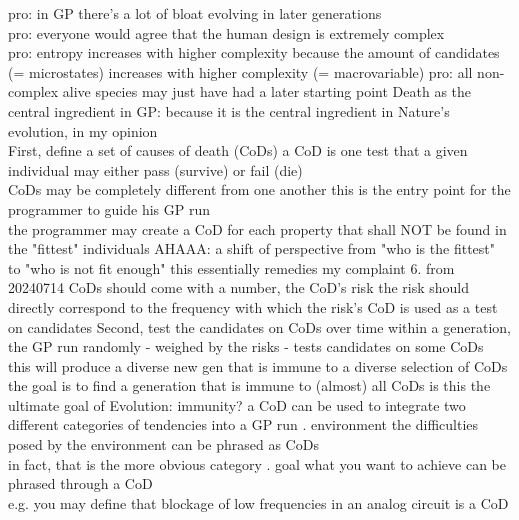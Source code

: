 \documentclass{article}\usepackage[margin=2cm]{geometry}
\begin{document}
\begin{cascade}
    pro: in GP there's a lot of bloat evolving in later generations\\
    pro: everyone would agree that the human design is extremely complex\\
    pro: entropy increases with higher complexity
    \stepin
    because the amount of candidates (= microstates) increases with higher complexity (= macrovariable)
    \stepout
    pro: all non-complex alive species may just have had a later starting point
    \stepout
    Death as the central ingredient in GP:
    \stepin
    because it is the central ingredient in Nature's evolution, in my opinion\\
    First, define a set of causes of death (CoDs)
    \stepin
    a CoD is one test that a given individual may either pass (survive) or fail (die)\\
    CoDs may be completely different from one another
    \stepin
    this is the entry point for the programmer to guide his GP run\\
    the programmer may create a CoD for each property that shall NOT be found in the "fittest" individuals
    \stepin
    AHAAA: a shift of perspective from "who is the fittest" to "who is not fit enough"
    \stepin
    this essentially remedies my complaint 6. from 20240714
    \stepout
    \stepout
    \stepout
    CoDs should come with a number, the CoD's risk
    \stepin
    the risk should directly correspond to the frequency with which the risk's CoD is used as a test on candidates
    \stepout
    \stepout
    Second, test the candidates on CoDs over time
    \stepin
    within a generation, the GP run randomly - weighed by the risks - tests candidates on some CoDs\\
    this will produce a diverse new gen that is immune to a diverse selection of CoDs\\
    the goal is to find a generation that is immune to (almost) all CoDs
    \stepin
    is this the ultimate goal of Evolution: immunity?
    \stepout
    \stepout
    a CoD can be used to integrate two different categories of tendencies into a GP run
    . environment
    \stepin
    the difficulties posed by the environment can be phrased as CoDs\\
    in fact, that is the more obvious category
    . goal
    \stepin
    what you want to achieve can be phrased through a CoD\\
    e.g. you may define that blockage of low frequencies in an analog circuit is a CoD\\

\end{cascade}
\end{document}
